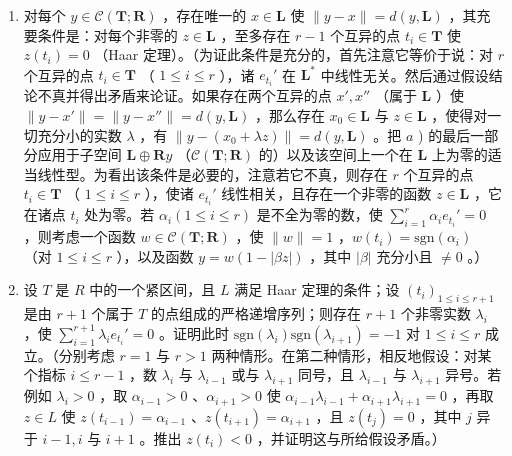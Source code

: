 \begin{enumerate}
\def\labelenumi{\alph{enumi})}
\setcounter{enumi}{1}
\tightlist
\item
  对每个 \(y \in \mathcal{C}(\mathbf{T}; \mathbf{R})\) ，存在唯一的 \(x \in \mathbf{L}\) 使 \(\| y - x \| = d(y, \mathbf{L})\) ，其充要条件是：对每个非零的 \(z \in \mathbf{L}\) ，至多存在 \(r - 1\) 个互异的点 \(t_i \in \mathbf{T}\) 使 \(z(t_i) = 0\) （Haar 定理）。（为证此条件是充分的，首先注意它等价于说：对 \(r\) 个互异的点 \(t_i \in \mathbf{T}\) （ \(1 \leqslant i \leqslant r\) ），诸 \(e_{t_i}'\) 在 \(\mathbf{L}^*\) 中线性无关。然后通过假设结论不真并得出矛盾来论证。如果存在两个互异的点 \(x', x''\) （属于 \(\mathbf{L}\) ）使 \(\| y - x' \| = \| y - x'' \| = d(y, \mathbf{L})\) ，那么存在 \(x_0 \in \mathbf{L}\) 与 \(z \in \mathbf{L}\) ，使得对一切充分小的实数 \(\lambda\) ，有 \(\| y - (x_0 + \lambda z) \| = d(y, \mathbf{L})\) 。把 \(a\) ) 的最后一部分应用于子空间 \(\mathbf{L} \oplus \mathbf{R}y\) （\(\mathcal{C}(\mathbf{T}; \mathbf{R})\) 的）以及该空间上一个在 \(\mathbf{L}\) 上为零的适当线性型。为看出该条件是必要的，注意若它不真，则存在 \(r\) 个互异的点 \(t_i \in \mathbf{T}\) （ \(1 \leqslant i \leqslant r\) ），使诸 \(e_{t_i}'\) 线性相关，且存在一个非零的函数 \(z \in \mathbf{L}\) ，它在诸点 \(t_i\) 处为零。若 \(\alpha_i (1 \leqslant i \leqslant r)\) 是不全为零的数，使 \(\sum_{i=1}^{r} \alpha_i e_{t_i}' = 0\) ，则考虑一个函数 \(w \in \mathcal{C}(\mathbf{T}; \mathbf{R})\) ，使 \(\| w \| = 1\) ，\(w(t_i) = \text{sgn}(\alpha_i)\) （对 \(1 \leqslant i \leqslant r\) ），以及函数 \(y = w(1 - |\beta z|)\) ，其中 \(|\beta|\) 充分小且 \(\neq 0\) 。）
\item
  设 \(T\) 是 \(R\) 中的一个紧区间，且 \(L\) 满足 Haar 定理的条件；设 \((t_i)_{1 \leqslant i \leqslant r+1}\) 是由 \(r + 1\) 个属于 \(T\) 的点组成的严格递增序列；则存在 \(r + 1\) 个非零实数 \(\lambda_i\) ，使 \(\sum_{i=1}^{r+1} \lambda_i e_{t_i}' = 0\) 。证明此时 \(\text{sgn}(\lambda_i) \text{sgn}(\lambda_{i+1}) = -1\) 对 \(1 \leqslant i \leqslant r\) 成立。（分别考虑 \(r = 1\) 与 \(r > 1\) 两种情形。在第二种情形，相反地假设：对某个指标 \(i \leqslant r - 1\) ，数 \(\lambda_i\) 与 \(\lambda_{i-1}\) 或与 \(\lambda_{i+1}\) 同号，且 \(\lambda_{i-1}\) 与 \(\lambda_{i+1}\) 异号。若例如 \(\lambda_i > 0\) ，取 \(\alpha_{i-1} > 0\) 、\(\alpha_{i+1} > 0\) 使 \(\alpha_{i-1} \lambda_{i-1} + \alpha_{i+1} \lambda_{i+1} = 0\) ，再取 \(z \in L\) 使 \(z(t_{i-1}) = \alpha_{i-1}\) 、\(z(t_{i+1}) = \alpha_{i+1}\) ，且 \(z(t_j) = 0\) ，其中 \(j\) 异于 \(i - 1, i\) 与 \(i + 1\) 。推出 \(z(t_i) < 0\) ，并证明这与所给假设矛盾。）
\end{enumerate}

